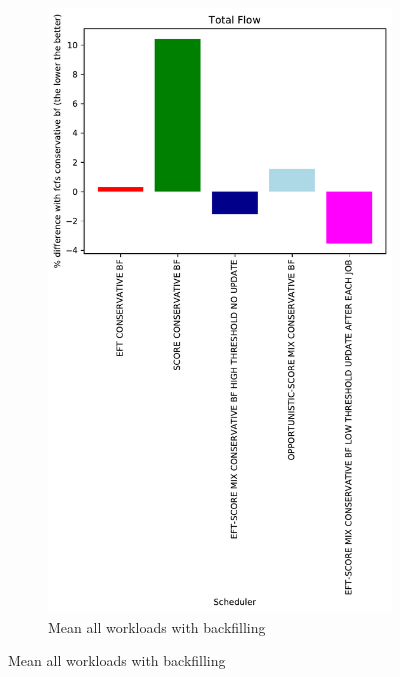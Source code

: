 \documentclass[a4paper]{article}
\begin{document}
\begin{figure}[H]
\begin{subfigure}[b]{0.4\linewidth}\centering\includegraphics[width=1\linewidth]{MBSS/plot/Results_Percentage_FCFS_BF_All_workloads_mean_Total_Flow_450_128_32_256_4_1024.pdf}\caption{Mean all workloads with backfilling}\end{subfigure}

\end{figure}
\end{document}
